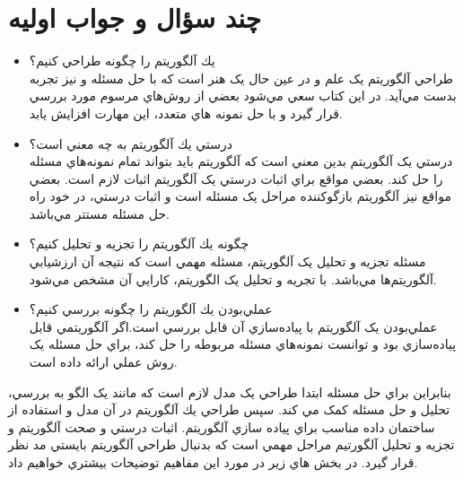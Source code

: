 \documentclass{book}
\begin{document}
\section*{چند سؤال و جواب اوليه}
\begin{itemize}
	\item 
يك آلگوريتم را چگونه طراحي كنيم؟\\
طراحي آلگوريتم يک علم و در عين حال يک هنر است که با حل مسئله و نيز تجربه بدست مي‌آيد. در اين کتاب سعي مي‌شود بعضي از روش‌هاي مرسوم مورد بررسي قرار گيرد و با حل نمونه هاي متعدد، اين مهارت افزايش يابد.
\item 
درستي يك آلگوريتم به چه معني است؟   \\
درستي يک آلگوريتم بدين معني است که آلگوريتم بايد بتواند تمام نمونه‌هاي مسئله را حل کند. بعضي مواقع براي اثبات درستي يک آلگوريتم اثبات لازم است. بعضي مواقع نيز آلگوريتم بازگوکننده مراحل يک مسئله است و اثبات درستي، در خود راه حل مسئله مستتر مي‌باشد.
\item 
چگونه يك آلگوريتم را تجزيه و تحليل كنيم؟  \\
مسئله تجزيه و تحليل يک آلگوريتم، مسئله مهمي است که نتيجه آن ارزشيابي آلگوريتم‌ها مي‌باشد. با تجريه و تحليل يک الگوريتم، کارايي آن مشخص مي‌شود.
\item 
عملي‌بودن يك آلگوريتم را چگونه بررسي كنيم؟   \\
عملي‌بودن يک آلگوريتم با پياده‌سازي آن قابل بررسي است.اگر آلگوريتمي قابل پياده‌سازي بود و توانست نمونه‌هاي مسئله مربوطه را حل کند، براي حل مسئله يک روش عملي ارائه داده است.
\end{itemize}
بنابراين براي حل مسئله ابتدا طراحي يک مدل لازم است که مانند يک الگو به بررسي، تحليل و حل مسئله کمک مي کند. سپس طراحي يك آلگوريتم در آن مدل و استفاده از ساختمان داده مناسب براي پياده سازي آلگوريتم. اثبات درستي و صحت آلگوريتم و تجزيه و تحليل آلگورتيم مراحل مهمي است که بدنبال طراحي آلگوريتم بايستي مد نظر قرار گيرد. در بخش هاي زير در مورد اين مفاهيم توضيحات بيشتري خواهيم داد.
\end{document}
